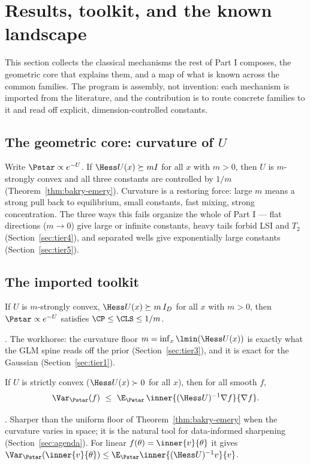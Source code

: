 \documentclass[../main.tex]{subfiles}
\begin{document}
\section{Results, toolkit, and the known landscape}
\label{sec:results}

This section collects the classical mechanisms the rest of Part I composes, the geometric
core that explains them, and a map of what is known across the common families. The program
is assembly, not invention: each mechanism is imported from the literature, and the
contribution is to route concrete families to it and read off explicit, dimension-controlled
constants.

\subsection{The geometric core: curvature of \texorpdfstring{$U$}{U}}
\label{subsec:curvature-core}

Write $\Pstar\propto e^{-U}$. If $\Hess U(x)\succeq mI$ for all $x$ with $m>0$, then $U$ is
$m$-strongly convex and all three constants are controlled by $1/m$ (Theorem~\ref{thm:bakry-emery}).
Curvature is a restoring force: large $m$ means a strong pull back to equilibrium, small
constants, fast mixing, strong concentration. The three ways this fails organize the whole of
Part I --- flat directions ($m\to0$) give large or infinite constants, heavy tails forbid
LSI and $T_2$ (Section~\ref{sec:tier4}), and separated wells give exponentially large
constants (Section~\ref{sec:tier5}).

\subsection{The imported toolkit}
\label{subsec:toolkit}

\begin{theorem}
\label{thm:bakry-emery}
If $U$ is $m$-strongly convex, $\Hess U(x)\succeq m\,I_D$ for all $x$ with $m>0$, then
$\Pstar\propto e^{-U}$ satisfies $\CP\le\CLS\le 1/m$.
\end{theorem}
\noindent\cite{BakryEmery1985,BakryGentilLedoux2014}. The workhorse: the curvature floor
$m=\inf_x\lmin(\Hess U(x))$ is exactly what the GLM spine reads off the prior
(Section~\ref{sec:tier3}), and it is exact for the Gaussian (Section~\ref{sec:tier1}).

\begin{theorem}
\label{thm:brascamp-lieb}
If $U$ is strictly convex ($\Hess U(x)\succ0$ for all $x$), then for all smooth $f$,
\[
  \Var_{\Pstar}(f)\ \le\ \E_{\Pstar}\,\inner{(\Hess U)^{-1}\nabla f}{\nabla f}.
\]
\end{theorem}
\noindent\cite{BrascampLieb1976}. Sharper than the uniform floor of
Theorem~\ref{thm:bakry-emery} when the curvature varies in space; it is the natural tool for
data-informed sharpening (Section~\ref{sec:agenda}). For linear $f(\theta)=\inner{v}{\theta}$
it gives $\Var_{\Pstar}(\inner{v}{\theta})\le\E_{\Pstar}\inner{(\Hess U)^{-1}v}{v}$.
\end{document}
